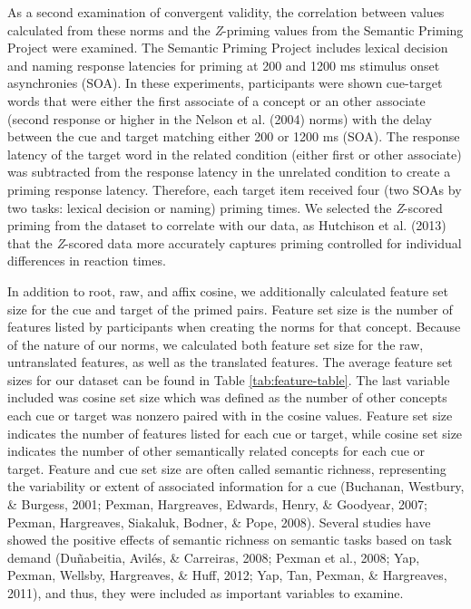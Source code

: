 \documentclass[english,,man]{apa6}
\theoremstyle{definition}
\theoremstyle{definition}
\theoremstyle{definition}
\theoremstyle{remark}
\begin{document}
As a second examination of convergent validity, the correlation between
values calculated from these norms and the \emph{Z}-priming values from
the Semantic Priming Project were examined. The Semantic Priming Project
includes lexical decision and naming response latencies for priming at
200 and 1200 ms stimulus onset asynchronies (SOA). In these experiments,
participants were shown cue-target words that were either the first
associate of a concept or an other associate (second response or higher
in the Nelson et al. (2004) norms) with the delay between the cue and
target matching either 200 or 1200 ms (SOA). The response latency of the
target word in the related condition (either first or other associate)
was subtracted from the response latency in the unrelated condition to
create a priming response latency. Therefore, each target item received
four (two SOAs by two tasks: lexical decision or naming) priming times.
We selected the \emph{Z}-scored priming from the dataset to correlate
with our data, as Hutchison et al. (2013) that the \emph{Z}-scored data
more accurately captures priming controlled for individual differences
in reaction times.

In addition to root, raw, and affix cosine, we additionally calculated
feature set size for the cue and target of the primed pairs. Feature set
size is the number of features listed by participants when creating the
norms for that concept. Because of the nature of our norms, we
calculated both feature set size for the raw, untranslated features, as
well as the translated features. The average feature set sizes for our
dataset can be found in Table \ref{tab:feature-table}. The last variable
included was cosine set size which was defined as the number of other
concepts each cue or target was nonzero paired with in the cosine
values. Feature set size indicates the number of features listed for
each cue or target, while cosine set size indicates the number of other
semantically related concepts for each cue or target. Feature and cue
set size are often called semantic richness, representing the
variability or extent of associated information for a cue (Buchanan,
Westbury, \& Burgess, 2001; Pexman, Hargreaves, Edwards, Henry, \&
Goodyear, 2007; Pexman, Hargreaves, Siakaluk, Bodner, \& Pope, 2008).
Several studies have showed the positive effects of semantic richness on
semantic tasks based on task demand (Duñabeitia, Avilés, \& Carreiras,
2008; Pexman et al., 2008; Yap, Pexman, Wellsby, Hargreaves, \& Huff,
2012; Yap, Tan, Pexman, \& Hargreaves, 2011), and thus, they were
included as important variables to examine.
\end{document}
